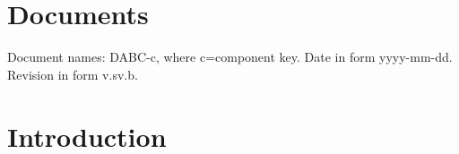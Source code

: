 \documentclass{dabcclass}
\begin{document}
 \cleardoublepage
\thispagestyle{empty} \tableofcontents \thispagestyle{empty} \cleardoublepage
{}

 \cleardoublepage
 \cleardoublepage
 \cleardoublepage

\setcounter{chapter}{0}
\chapter{Documents}
Document names: DABC-c, where c=component key. Date in form yyyy-mm-dd.
Revision in form v.sv.b.\\

%


%


%
%
\cleardoublepage
\chapter{Introduction}
 \cleardoublepage
\end{document}

